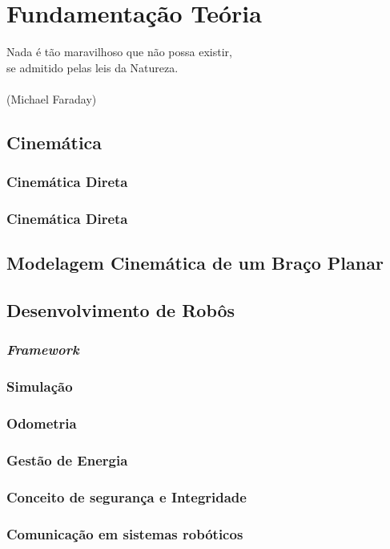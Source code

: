 \chapter{Fundamentação Teória}
\label{chap:concep}

\begin{flushright}
  Nada é tão maravilhoso que não possa existir, \\
  se admitido pelas leis da Natureza. \\
  \ \\
  (Michael Faraday)
\end{flushright}

\section{Cinemática}\label{sec:cinem}
\subsection{Cinemática Direta}\label{sec:cinem_dir}
\subsection{Cinemática Direta}\label{sec:cinem_inv}

\section{Modelagem Cinemática de um Braço Planar}\label{sec:brac_plan}


\section{Desenvolvimento de Robôs}\label{sec:desen_robo}
\subsection{\textit{Framework}}\label{sec:framework}
\subsection{Simulação}\label{sec:simula}
\subsection{Odometria}\label{sec:odom}
\subsection{Gestão de Energia}\label{sec:gestao}
\subsection{Conceito de segurança e Integridade}\label{sec:segur_inte}
\subsection{Comunicação em sistemas robóticos}\label{sec:comm_sis}